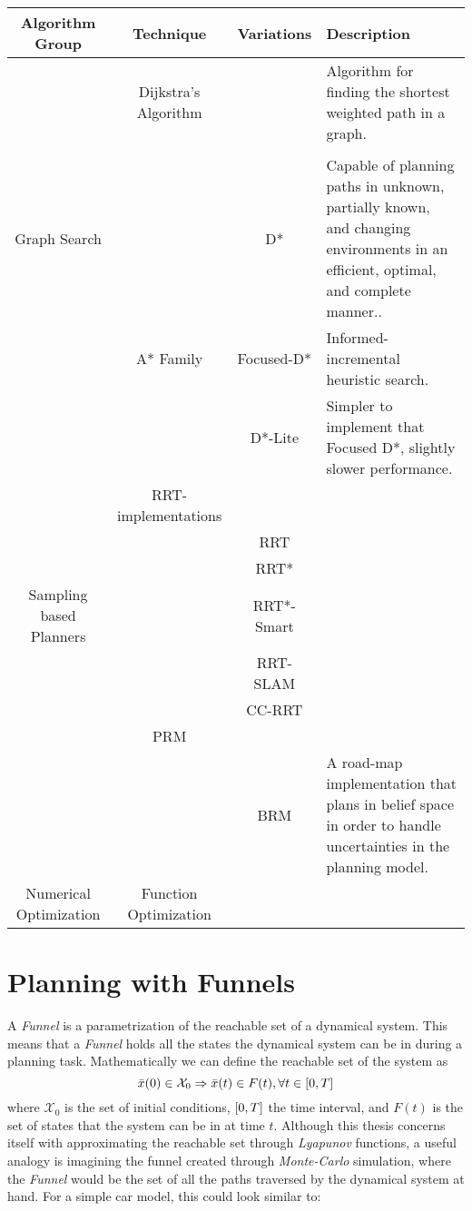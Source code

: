 \begin{table}
  \begin{tabular}{c c c p{4cm}}
    \hline
    \hline
    Algorithm Group & Technique & Variations & Description \\
    \hline
                    &  Dijkstra's Algorithm & &Algorithm for finding the shortest weighted path in a graph.\\
                    &  \\
    Graph Search               & & D* & Capable of planning paths in unknown, partially known, and changing environments in an efficient, optimal, and complete manner..\\
                    & A* Family & Focused-D* & Informed-incremental heuristic search.\\
                    & & D*-Lite & Simpler to implement that Focused D*, slightly slower performance.\\
    \hline
                    & RRT-implementations \\
                    & & RRT\\
                    & & RRT*\\
    Sampling based Planners& & RRT*-Smart\\
                    & & RRT-SLAM\\
                    & & CC-RRT\\
                    & PRM \\
                    & & BRM & A road-map implementation that plans in belief space in order to handle uncertainties in the planning model.\\
    \hline
    Numerical Optimization &  Function Optimization \\
    \hline
  \end{tabular} 
\end{table}

\section{Planning with Funnels}

A \textit{Funnel} is a parametrization of the reachable set of a dynamical
system. This means that a \textit{Funnel} holds all the states the dynamical
system can be in during a planning task. Mathematically we can define the
reachable set of the system as
\[
  \bar{x}(0) \in \mathcal{X}_0 \Rightarrow \bar{x}(t) \in F(t), \forall t \in \lbrack0,T\rbrack
\]
where \(\mathcal{X}_0\) is the set of initial conditions, \(\lbrack0,T\rbrack\) the time
interval, and \(F(t)\) is the set of states that the system can be in at time
\(t\). Although this thesis concerns itself with approximating the reachable set
through \textit{Lyapunov} functions, a useful analogy is imagining the funnel
created through \textit{Monte-Carlo} simulation, where the \textit{Funnel} would
be the set of all the paths traversed by the dynamical system at hand. For a
simple car model, this could look similar to:

